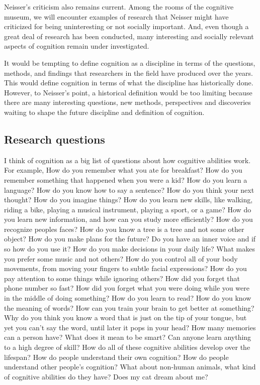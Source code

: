 \documentclass[
  oneside,
  12pt]{crumpbook}
\begin{document}
Neisser's criticism also remains current. Among the rooms of the cognitive museum, we will encounter examples of research that Neisser might have criticized for being uninteresting or not socially important. And, even though a great deal of research has been conducted, many interesting and socially relevant aspects of cognition remain under investigated.

It would be tempting to define cognition as a discipline in terms of the questions, methods, and findings that researchers in the field have produced over the years. This would define cognition in terms of what the discipline has historically done. However, to Neisser's point, a historical definition would be too limiting because there are many interesting questions, new methods, perspectives and discoveries waiting to shape the future discipline and definition of cognition.

\hypertarget{research-questions}{%
\subsection{Research questions}\label{research-questions}}

I think of cognition as a big list of questions about how cognitive abilities work. For example, How do you remember what you ate for breakfast? How do you remember something that happened when you were a kid? How do you learn a language? How do you know how to say a sentence? How do you think your next thought? How do you imagine things? How do you learn new skills, like walking, riding a bike, playing a musical instrument, playing a sport, or a game? How do you learn new information, and how can you study more efficiently? How do you recognize peoples faces? How do you know a tree is a tree and not some other object? How do you make plans for the future? Do you have an inner voice and if so how do you use it? How do you make decisions in your daily life? What makes you prefer some music and not others? How do you control all of your body movements, from moving your fingers to subtle facial expressions? How do you pay attention to some things while ignoring others? How did you forget that phone number so fast? How did you forget what you were doing while you were in the middle of doing something? How do you learn to read? How do you know the meaning of words? How can you train your brain to get better at something? Why do you think you know a word that is just on the tip of your tongue, but yet you can't say the word, until later it pops in your head? How many memories can a person have? What does it mean to be smart? Can anyone learn anything to a high degree of skill? How do all of these cognitive abilities develop over the lifespan? How do people understand their own cognition? How do people understand other people's cognition? What about non-human animals, what kind of cognitive abilities do they have? Does my cat dream about me?
\end{document}
